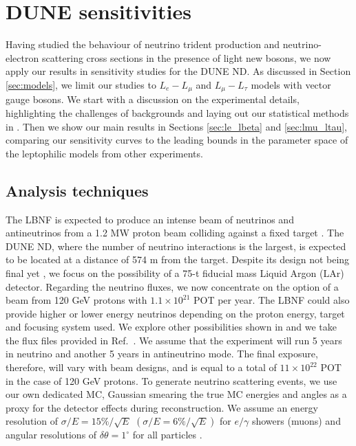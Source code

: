 \section{\label{sec:sensitivities}DUNE sensitivities}

Having studied the behaviour of neutrino trident production and neutrino-electron scattering cross sections in the presence of light new bosons, we now apply our results in sensitivity studies for the DUNE ND. As discussed in Section \ref{sec:models}, we limit our studies to $L_e- L_\mu$ and $L_\mu- L_\tau$ models with vector gauge bosons. We start with a discussion on the experimental details, highlighting the challenges of backgrounds and laying out our statistical methods in . Then we show our main results in Sections \ref{sec:le_lbeta} and \ref{sec:lmu_ltau}, comparing our sensitivity curves to the leading bounds in the parameter space of the leptophilic models from other experiments.

\subsection{Analysis techniques}\label{sec:experimental}

The LBNF is expected to produce an intense beam of neutrinos and antineutrinos from a 1.2 MW proton beam colliding against a fixed target \cite{Acciarri:2016crz}. The DUNE ND, where the number of neutrino interactions is the largest, is expected to be located at a distance of 574 m from the target. Despite its design not being final yet \cite{Roeck:2018,Manly:2018}, we focus on the possibility of a 75-t fiducial mass Liquid Argon (LAr) detector. Regarding the neutrino fluxes, we now concentrate on the option of a beam from 120 GeV protons with $1.1\times10^{21}$ POT per year. The LBNF could also provide higher or lower energy neutrinos depending on the proton energy, target and focusing system used. We explore other possibilities shown in  and we take the flux files provided in Ref.~\cite{DUNE:flux,DUNE:flux_updated}. We assume that the experiment will run 5 years in neutrino and another 5 years in antineutrino mode. The final exposure, therefore, will vary with beam designs, and is equal to a total of $11\times10^{22}$ POT in the case of 120 GeV protons. To generate neutrino scattering events, we use our own dedicated MC, Gaussian smearing the true MC energies and angles as a proxy for the detector effects during reconstruction. We assume an energy resolution of $\sigma/E = 15\%/\sqrt{E}$ $(\sigma/E = 6\%/\sqrt{E})$ for $e/\gamma$ showers (muons) and angular resolutions of $\delta\theta=1^\circ$ for all particles \cite{DUNECDRvolII}.


